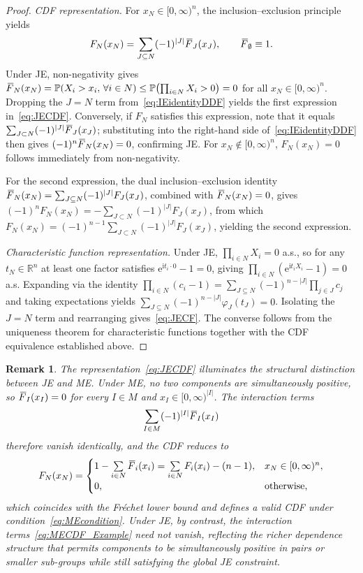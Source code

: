 \documentclass[letterpaper,12pt]{article}
\def \P {\mathbb{P}}
\def \RR {\mathbb{R}}
\numberwithin{equation}{section}
\newtheorem{remark}[theorem]{Remark}
\newcommand{\N}{{N}}
\newcommand{\M}{{M}}
\newcommand{\I}{{I}}
\newcommand{\F}{\,\overline{\kern-0.175em F\kern-0em}}
\begin{document}
{\begin{proof}
\textit{CDF representation.}
For $x_{\N}\in[0,\infty)^n$, the inclusion--exclusion principle yields
\begin{equation}
\label{eq:IEidentityDDF}
F_{\N}(x_{\N}) = \sum_{J\subseteq\N}(-1)^{|J|}\F_J(x_J), \qquad \F_\emptyset\equiv 1.
\end{equation}
Under JE, non-negativity gives $\F_{\N}(x_{\N})=\P(X_i>x_i,\,\forall
i\in\N)\le \P\bigl(\prod_{i\in\N}X_i>0\bigr)=0$ for all $x_\N\in[0,\infty)^n$.
Dropping the $J=\N$ term from~\eqref{eq:IEidentityDDF} yields the first expression
in~\eqref{eq:JECDF}. Conversely, if $F_\N$ satisfies this expression, note that
it equals $\sum_{J\subset\N}(-1)^{|J|}\F_J(x_J)$; substituting into the
right-hand side of~\eqref{eq:IEidentityDDF} then gives $(-1)^n\F_\N(x_\N)=0$,
confirming JE. For $x_\N\notin[0,\infty)^n$, $F_\N(x_\N)=0$ follows immediately
from non-negativity.

For the second expression, the dual inclusion--exclusion identity
$\F_{\N}(x_\N)=\sum_{J\subseteq\N}(-1)^{|J|}F_J(x_J)$, combined with
$\F_\N(x_\N)=0$, gives $(-1)^nF_\N(x_\N)=-\sum_{J\subset\N}(-1)^{|J|}F_J(x_J)$,
from which
$F_\N(x_\N)=(-1)^{n-1}\sum_{J\subset\N}(-1)^{|J|}F_J(x_J)$,
yielding the second expression.

\textit{Characteristic function representation.}
Under JE, $\prod_{i\in\N}X_i=0$ a.s., so for any $t_\N\in\RR^n$ at least one
factor satisfies $\mathrm{e}^{\mathrm{i}t_i\cdot 0}-1=0$, giving
$\prod_{i\in\N}(\mathrm{e}^{\mathrm{i}t_iX_i}-1)=0$ a.s.
Expanding via the identity
$\prod_{i\in\N}(c_i-1)=\sum_{J\subseteq\N}(-1)^{n-|J|}\prod_{j\in J}c_j$
and taking expectations yields
$\sum_{J\subseteq\N}(-1)^{n-|J|}\varphi_J(t_J)=0$.
Isolating the $J=\N$ term and rearranging gives~\eqref{eq:JECF}. The converse
follows from the uniqueness theorem for characteristic functions together with the
CDF equivalence established above.
\end{proof}

\begin{remark}
\label{rm:JECDFrm}
The representation~\eqref{eq:JECDF} illuminates the structural distinction between
JE and ME. Under ME, no two components are simultaneously positive, so
$\F_{\I}(x_\I)=0$ for every $\I\in\M$ and $x_\I\in[0,\infty)^{|\I|}$. The
interaction terms
\begin{equation}
\label{eq:MECDF_Example}
\sum_{\I\in\M}(-1)^{|\I|}\F_{\I}(x_{\I})
\end{equation}
therefore vanish identically, and the CDF reduces to
\[
F_{\N}(x_{\N})=\begin{cases}
1-\sum\limits_{i\in\N}\F_i(x_i)
=\sum\limits_{i\in\N}F_i(x_i)-(n-1), & x_{\N}\in[0,\infty)^n,\\[4pt]
0, & \text{otherwise,}
\end{cases}
\]
which coincides with the Fr\'{e}chet lower bound and defines a valid CDF under
condition~\eqref{eq:MEcondition}. Under JE, by contrast, the interaction
terms~\eqref{eq:MECDF_Example} need not vanish, reflecting the richer dependence
structure that permits components to be simultaneously positive in pairs or smaller
sub-groups while still satisfying the global JE constraint.
\end{remark}
}
\end{document}
